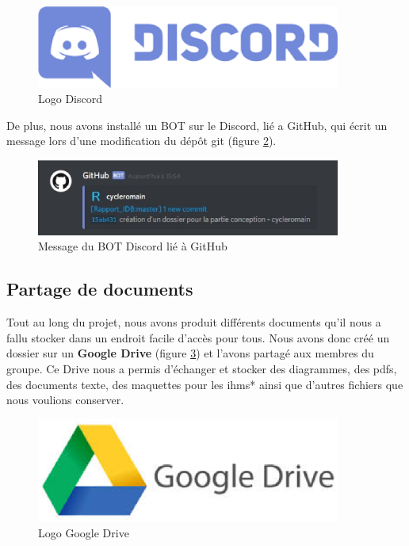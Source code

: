\begin{figure}[!p]
\centering
\includegraphics[width=10cm]{./images/activite/discordLogo.eps}
\caption{Logo Discord}
\label{discord_logo}
\end{figure}

De plus, nous avons installé un BOT sur le Discord, lié a GitHub, qui écrit un message lors d'une modification du dép\^ot git (figure \ref{bot_discord}).

\begin{figure}[!p]
\centering
\includegraphics[width=10cm]{./images/activite/bot_discord.eps}
\caption{Message du BOT Discord lié à GitHub}
\label{bot_discord}
\end{figure}



\subsection{Partage de documents}
Tout au long du projet, nous avons produit différents documents qu'il nous a fallu stocker dans un endroit facile d'accès pour tous. 
Nous avons donc créé un dossier sur un \textbf{Google Drive} (figure \ref{googledrive_logo}) et l'avons partagé aux membres du groupe. Ce Drive nous a permis d'échanger et stocker des diagrammes, des pdfs, des documents texte, des maquettes pour les \glspl{ihm}* ainsi que d'autres fichiers que nous voulions conserver.

\begin{figure}[!p]
\centering
\includegraphics[width=10cm]{./images/activite/googleDriveLogo.eps}
\caption{Logo Google Drive}
\label{googledrive_logo}
\end{figure}




